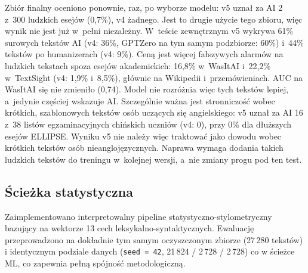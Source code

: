 Zbiór finalny oceniono ponownie, raz, po wyborze modelu: v5 uznał za AI 2 z~300 ludzkich esejów
(0,7\%), v4 żadnego. Jest to drugie użycie tego zbioru, więc wynik nie jest już w~pełni niezależny.
W~teście zewnętrznym v5 wykrywa 61\% surowych tekstów AI (v4: 36\%, GPTZero na tym samym podzbiorze: 60\%)
i~44\% tekstów po humanizerach (v4: 9\%). Ceną jest więcej fałszywych alarmów na ludzkich tekstach
spoza esejów akademickich: 16,8\% w~WasItAI i~22,2\% w~TextSight (v4: 1,9\% i~8,5\%), głównie
na Wikipedii i~przemówieniach. AUC na WasItAI się nie zmieniło (0,74). Model nie rozróżnia więc
tych tekstów lepiej, a~jedynie częściej wskazuje AI. Szczególnie ważna jest stronniczość wobec
krótkich, szablonowych tekstów osób uczących się angielskiego: v5 uznał za AI 16 z~38 listów
egzaminacyjnych chińskich uczniów (v4: 0), przy 0\% dla dłuższych esejów ELLIPSE. Wyniku v5
nie należy więc traktować jako dowodu wobec krótkich tekstów osób nieanglojęzycznych. Naprawa
wymaga dodania takich ludzkich tekstów do treningu w~kolejnej wersji, a~nie zmiany progu pod ten test.

\subsection{Ścieżka statystyczna}

Zaimplementowano interpretowalny pipeline statystyczno-stylometryczny bazujący
na wektorze 13 cech leksykalno-syntaktycznych. Ewaluację przeprowadzono na
dokładnie tym samym oczyszczonym zbiorze (27\,280 tekstów) i identycznym
podziale danych (\texttt{seed = 42}, 21\,824 / 2\,728 / 2\,728) co w ścieżce ML,
co zapewnia pełną spójność metodologiczną.

